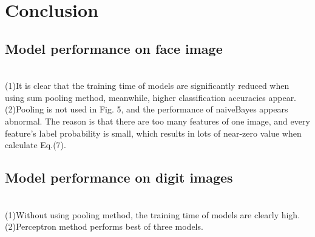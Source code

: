 \documentclass{article}
\begin{document}
\section{Conclusion}
\subsection{Model performance on face image}
\\(1)It is clear that the training time of models are significantly reduced when using sum pooling method, meanwhile, higher classification accuracies appear.
\\(2)Pooling is not used in Fig. 5, and the performance of naiveBayes appears abnormal. The reason is that there are too many features of one image, and every feature’s label probability is small, which results in lots of near-zero value when calculate Eq.(7).
\subsection{Model performance on digit images}
\\(1)Without using pooling method, the training time of models are clearly high.
\\(2)Perceptron method performs best of three models.
\end{document}
